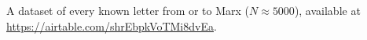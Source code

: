 A dataset of every known letter from or to Marx ($N \approx 5000$), available at \href{https://airtable.com/shrEbpkVoTMi8dvEa}{https://airtable.com/shrEbpkVoTMi8dvEa}.


